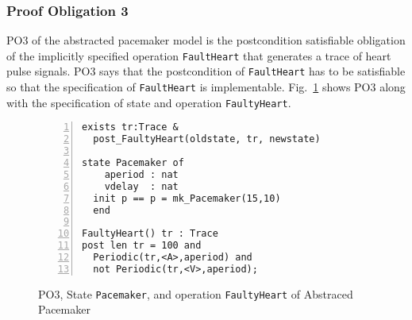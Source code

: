 


\subsubsection{Proof Obligation 3}

PO3 of the abstracted pacemaker model is the postcondition satisfiable obligation of the implicitly specified operation {\tt FaultHeart} that generates a trace of heart pulse signals. PO3 says that the postcondition of {\tt FaultHeart} has to be satisfiable so that the specification of {\tt FaultHeart} is implementable. Fig.~\ref{fig:po3_case1} shows PO3 along with the specification of state and operation {\tt FaultyHeart}.

\begin{figure}[t]
\begin{center}
\begin{mdframed}[roundcorner=5pt]
\begin{Verbatim}[fontsize=\small,numbers=left]
exists tr:Trace &
  post_FaultyHeart(oldstate, tr, newstate)

state Pacemaker of
    aperiod : nat 
    vdelay  : nat
  init p == p = mk_Pacemaker(15,10)
  end

FaultyHeart() tr : Trace
post len tr = 100 and
  Periodic(tr,<A>,aperiod) and 
  not Periodic(tr,<V>,aperiod);
\end{Verbatim}
\end{mdframed}
\vspace{-10pt}
\caption{PO3, State {\tt Pacemaker}, and operation {\tt FaultyHeart} of Abstraced Pacemaker}
\label{fig:po3_case1}
\end{center}
\end{figure}

